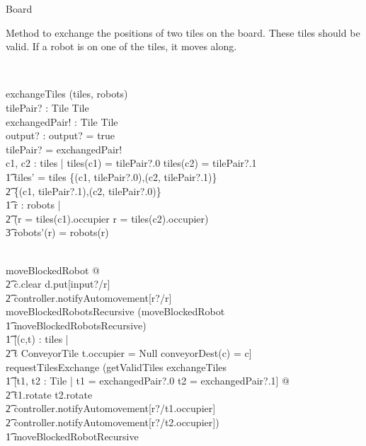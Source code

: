 \documentclass[12pt]{article}
\begin{document}
\begin{class}{Board}
\begin{classcom}
Method to exchange the positions of two tiles on the board. These tiles should be valid. If a robot is on one of the tiles, it moves along.
\end{classcom} \\
\begin{schema}{exchangeTiles}
\Delta(tiles, robots) \\
tilePair? : Tile \cross Tile \\
exchangedPair! : Tile \cross Tile \\
output? : \bool
\where
output? = true\\
tilePair? = exchangedPair! \\
\also \also \also
\exists c1, c2 : \dom tiles | tiles(c1) = tilePair?.0 \wedge tiles(c2) = tilePair?.1 \; \; \wedge \\ \t1
tiles' = tiles \setminus \{(c1, tilePair?.0),(c2, tilePair?.1)\} \cup \\ \t2 \{(c1, tilePair?.1),(c2, tilePair?.0)\}
\\ \t1 \forall r : \dom robots | \\ \t2 (r \not = tiles(c1).occupier \wedge r \not = tiles(c2).occupier) \Rightarrow \\ \t3 robots'(r) = robots(r)
\end{schema} \\
moveBlockedRobot \sdef [c, d : \dom tiles, r : \dom robots | \\ \t1 tiles(c) \in ConveyorTile \wedge tiles(c).occupier = r \; \; \wedge \\ \t1 conveyorDest(c) \not = c \wedge conveyorDest(c) = d] @ \\ \t2 c.clear \wedge d.put[input?/r] \; \; \wedge \\ \t2 controller.notifyAutomovement[r?/r] \\
moveBlockedRobotsRecursive \sdef (moveBlockedRobot \; \; \comp \\ \t1 moveBlockedRobotsRecursive) \; \; [] \\ \t1 [\neg \exists (c,t) : tiles | \\ \t2 t \in ConveyorTile \wedge t.occupier \not = Null \wedge conveyorDest(c) = c] \\
\znewpage
requestTilesExchange \sdef (getValidTiles \comp exchangeTiles \; \; \comp \\
\t1 [t1, t2 : Tile | t1 = exchangedPair?.0 \wedge t2 = exchangedPair?.1] @ \\ \t2 t1.rotate \wedge t2.rotate \; \; \wedge \\ \t2 controller.notifyAutomovement[r?/t1.occupier] \; \; \wedge \\ \t2 controller.notifyAutomovement[r?/t2.occupier]) \; \; \comp \\ \t1 moveBlockedRobotRecursive \\

\end{class}
\end{document}
